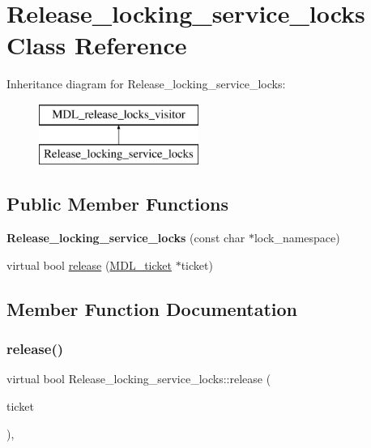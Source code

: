 \hypertarget{classRelease__locking__service__locks}{}\section{Release\+\_\+locking\+\_\+service\+\_\+locks Class Reference}
\label{classRelease__locking__service__locks}
Inheritance diagram for Release\+\_\+locking\+\_\+service\+\_\+locks\+:\begin{figure}[H]
\begin{center}
\leavevmode
\includegraphics[height=2.000000cm]{classRelease__locking__service__locks}
\end{center}
\end{figure}
\subsection*{Public Member Functions}
\begin{DoxyCompactItemize}
\item 
\mbox{\label{classRelease__locking__service__locks_a36c1494c4cd0f0384c752529ba343ca7}} 
{\bfseries Release\+\_\+locking\+\_\+service\+\_\+locks} (const char $\ast$lock\+\_\+namespace)
\item 
virtual bool \mbox{\hyperlink{classRelease__locking__service__locks_a95d3c4e147418ae0fe72017ad4068cd3}{release}} (\mbox{\hyperlink{classMDL__ticket}{M\+D\+L\+\_\+ticket}} $\ast$ticket)
\end{DoxyCompactItemize}


\subsection{Member Function Documentation}
\mbox{\label{classRelease__locking__service__locks_a95d3c4e147418ae0fe72017ad4068cd3}} 
\subsubsection{\texorpdfstring{release()}{release()}}
{\footnotesize\ttfamily virtual bool Release\+\_\+locking\+\_\+service\+\_\+locks\+::release (\begin{DoxyParamCaption}\item[{\mbox{\hyperlink{classMDL__ticket}{M\+D\+L\+\_\+ticket}} $\ast$}]{ticket }\end{DoxyParamCaption})\hspace{0.3cm}{\ttfamily [inline]}, {\ttfamily [virtual]}}

